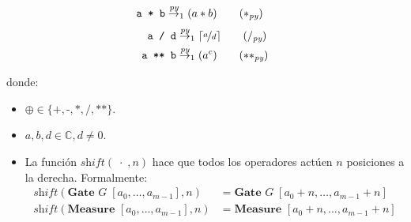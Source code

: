 \begin{definicion}
\begin{multicols}{2}
\begin{align}
     \texttt{a * b} &\redpy_1 (a*b) \tag{$*_\textit{py}$}
 \end{align}
 \columnbreak
\begin{align}
     \texttt{a / d} &\redpy_1 \lceil \nicefrac{a}{d}\rceil \tag{$/_\textit{py}$}\\
     \texttt{a ** b} &\redpy_1 (a^c) \tag{$**_\textit{py}$}
\end{align}
\end{multicols}
 \vspace{-2\baselineskip}
donde:
\begin{itemize}
    \item $\oplus \in \{\texttt{+}, \texttt{-}, \texttt{*}, \texttt{/}, \texttt{**}\}$.
    \item $a,b,d\in\mathbb{C}, d\neq 0$.
    \item La función $\textit{shift}(\;\cdot\;, n)$ hace que todos los operadores actúen $n$ posiciones a la derecha. Formalmente:
 \vspace{-0.5\baselineskip}
    \begin{align*}
    \textit{shift}(\textbf{Gate } G\;[a_0, \dots, a_{m-1}], n) &= \textbf{Gate } G\;[a_0+n, \dots, a_{m-1}+n] \\
    \textit{shift}(\textbf{Measure } [a_0, \dots, a_{m-1}], n) &= \textbf{Measure } [a_0+n, \dots, a_{m-1}+n]
    \end{align*}
\end{itemize}
 \vspace{0.1\baselineskip}
\end{definicion}







